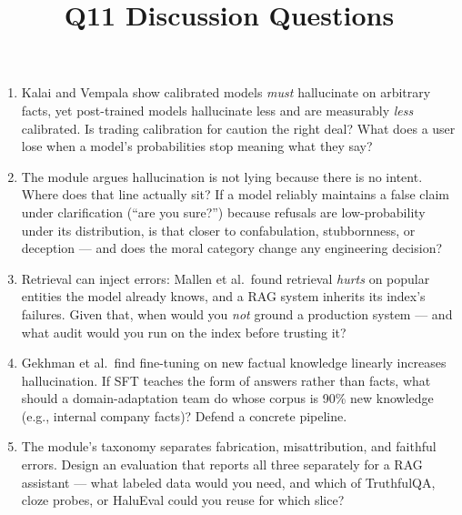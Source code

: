 \documentclass[11pt]{article}
\title{Q11 Discussion Questions}
\date{}
\begin{document}
\maketitle
\begin{enumerate}[noitemsep]
\item Kalai and Vempala show calibrated models \emph{must} hallucinate on arbitrary facts, yet post-trained models hallucinate less and are measurably \emph{less} calibrated. Is trading calibration for caution the right deal? What does a user lose when a model's probabilities stop meaning what they say?
\item The module argues hallucination is not lying because there is no intent. Where does that line actually sit? If a model reliably maintains a false claim under clarification (``are you sure?'') because refusals are low-probability under its distribution, is that closer to confabulation, stubbornness, or deception --- and does the moral category change any engineering decision?
\item Retrieval can inject errors: Mallen et al.\ found retrieval \emph{hurts} on popular entities the model already knows, and a RAG system inherits its index's failures. Given that, when would you \emph{not} ground a production system --- and what audit would you run on the index before trusting it?
\item Gekhman et al.\ find fine-tuning on new factual knowledge linearly increases hallucination. If SFT teaches the form of answers rather than facts, what should a domain-adaptation team do whose corpus is 90\% new knowledge (e.g., internal company facts)? Defend a concrete pipeline.
\item The module's taxonomy separates fabrication, misattribution, and faithful errors. Design an evaluation that reports all three separately for a RAG assistant --- what labeled data would you need, and which of TruthfulQA, cloze probes, or HaluEval could you reuse for which slice?
\end{enumerate}
\end{document}
